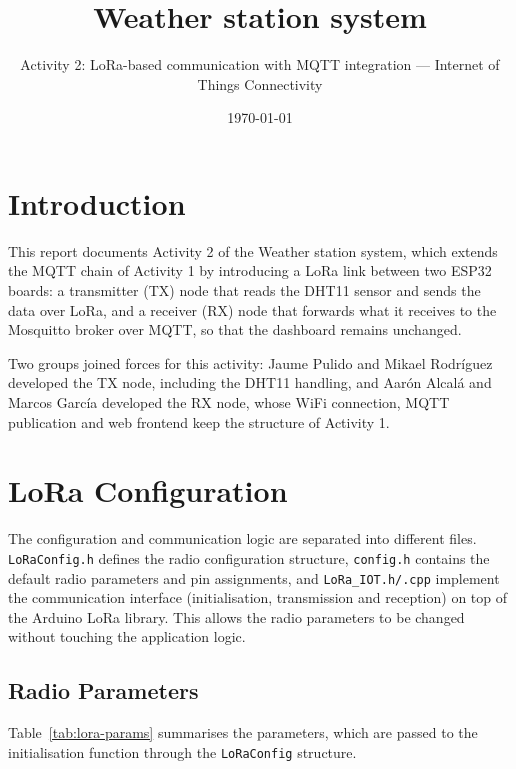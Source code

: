\documentclass[informe,english]{plantilla}
\title{Weather station system}
\subtitle{Activity 2: LoRa-based communication with MQTT integration ---
  \textsf{Internet of Things Connectivity}}
\date{\today}
\begin{document}
\newpage

\section{Introduction}
\label{sec:intro}
This report documents Activity 2 of the Weather station system, which extends the MQTT chain of Activity 1 by introducing a LoRa link between two ESP32 boards: a transmitter (TX) node that reads the DHT11 sensor and sends the data over LoRa, and a receiver (RX) node that forwards what it receives to the Mosquitto broker over MQTT, so that the dashboard remains unchanged.

Two groups joined forces for this activity: Jaume Pulido and Mikael Rodríguez developed the TX node, including the DHT11 handling, and Aarón Alcalá and Marcos García developed the RX node, whose WiFi connection, MQTT publication and web frontend keep the structure of Activity 1.

\section{LoRa Configuration}
\label{sec:lora-config}

The configuration and communication logic are separated into different files. \texttt{LoRaConfig.h} defines the radio configuration structure, \texttt{config.h} contains the default radio parameters and pin assignments, and \texttt{LoRa\_IOT.h/.cpp} implement the communication interface (initialisation, transmission and reception) on top of the Arduino LoRa library. This allows the radio parameters to be changed without touching the application logic.

\subsection{Radio Parameters}
\label{sec:lora-params}

Table~\ref{tab:lora-params} summarises the parameters, which are passed to the initialisation function through the \texttt{LoRaConfig} structure.
\end{document}

